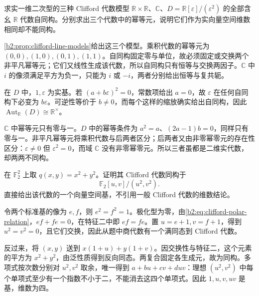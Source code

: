\begin{optionalexercise}\label{b2:ex:10-clifford-line}
	求实一维二次型的三种 Clifford 代数模型 \(\mathbb R\times\mathbb R\)、\(\mathbb C\)、\(D=\mathbb R[\varepsilon]/(\varepsilon^2)\) 的全部含幺 \(\mathbb R\) 代数自同构。分别求出三个代数中的幂等元，说明它们作为实向量空间维数相同却不能同构。
\end{optionalexercise}
\begin{solution}
	\cref{b2:prop:clifford-line-models}给出这三个模型。乘积代数的幂等元为 \((0,0),(1,0),(0,1),(1,1)\)。自同构固定零与单位，故必须固定或交换两个非平凡幂等元；它们又线性生成该代数，所以自同构只有恒等与交换两因子。\(\mathbb C\) 中 \(i\) 的像须满足平方为负一，只能为 \(i\) 或 \(-i\)，两者分别给出恒等与复共轭。

	在 \(D\) 中，\(1,\varepsilon\) 为实基。若 \((a+b\varepsilon)^2=0\)，常数项给出 \(a=0\)，故 \(\varepsilon\) 在任何自同构下必变为 \(b\varepsilon\)。可逆性等价于 \(b\ne0\)，而每个这样的缩放确实给出自同构，因此 \(\operatorname{Aut}_{\mathbb R}(D)\cong\mathbb R^\times\)。

	\(\mathbb C\) 中幂等元只有零与一。\(D\) 中的幂等条件为 \(a^2=a\)、\((2a-1)b=0\)，同样只有零与一。非平凡幂等元将乘积代数与后两者区分；后两者又由非零幂零元的存在性区分：\(\varepsilon\ne0\) 但 \(\varepsilon^2=0\)，而域 \(\mathbb C\) 没有非零幂零元。所以三者虽都是二维实代数，却两两不同构。
\end{solution}

\begin{optionalexercise}\label{b2:ex:10-clifford-char-two}
	在 \(\mathbb F_2^2\) 上取 \(q(x,y)=x^2+y^2\)。证明其 Clifford 代数同构于
	\[
		\mathbb F_2[u,v]/(u^2,v^2).
	\]
	直接给出该代数的一个向量空间基，不引用一般 Clifford 代数的维数结论。
\end{optionalexercise}
\begin{solution}
	令两个标准基的像为 \(e,f\)，则 \(e^2=f^2=1\)。极化型为零，由\eqref{b2:eq:clifford-polar-relation}，\(ef+fe=0\)，在特征二中即 \(ef=fe\)。置 \(u=e+1,v=f+1\)，得到 \(u^2=v^2=0\)，且它们交换，因此从题中商代数有一个满同态到 Clifford 代数。

	反过来，将 \((x,y)\) 送到 \(x(1+u)+y(1+v)\)。因交换性与特征二，这个元素的平方为 \(x^2+y^2\)，由泛性质得到反向同态。两复合固定各生成元，故为同构。多项式按次数分别对 \(u^2,v^2\) 取余，唯一得到 \(a+bu+cv+duv\)：理想 \((u^2,v^2)\) 中每个单项式至少有一个指数不小于二，不能消去这四个单项式。因此 \(1,u,v,uv\) 是基，维数为四。
\end{solution}
